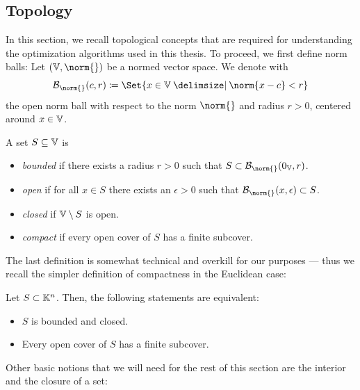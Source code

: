 \subsection{Topology}
In this section, we recall topological concepts that are required for understanding the optimization algorithms used in this thesis.
To proceed, we first define norm balls:
Let \( (\V, \norm{}) \) be a normed vector space.
We denote with
\begin{equation}
	\Ball{\norm{}}{c}{r} \coloneqq \Set{x \in \V \given \norm{x - c} < r}
\end{equation}
the open norm ball with respect to the norm \( \norm{} \) and radius \( r > \num{0} \), centered around \( x \in \mathbb{V} \).

A set \( S \subseteq \mathbb{V} \) is
\begin{itemize}
	\item \emph{bounded} if there exists a radius \( r > \num{0} \) such that \( S \subset \Ball{\norm{}}{\num{0}_{\V}}{r} \).
	\item \emph{open} if for all \( x \in S \) there exists an \( \epsilon > \num{0} \) such that \( \Ball{\norm{}}{x}{\epsilon} \subset S \).
	\item \emph{closed} if \( \mathbb{V} \setminus S \) is open.
	\item \emph{compact} if every open cover of \( S \) has a finite subcover.
\end{itemize}
The last definition is somewhat technical and overkill for our purposes --- thus we recall the simpler definition of compactness in the Euclidean case:
\begin{theorem}%
	\label{def:heine-borel}
	Let \( S \subset \mathbb{K}^n \).
	Then, the following statements are equivalent:
	\begin{itemize}
		\item \( S \) is bounded and closed.
		\item Every open cover of \( S \) has a finite subcover.
	\end{itemize}
\end{theorem}
Other basic notions that we will need for the rest of this section are the interior and the closure of a set:
